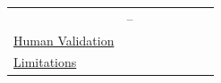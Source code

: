 \documentclass[smallextended]{svjour3}
\newcommand{\must}{\textbf{must}\xspace}
\newcommand{\should}{\textbf{should}\xspace}
\newcommand{\iconM}{\usebox{\iconMbox}\xspace}
\newcommand{\iconS}{\usebox{\iconSbox}\xspace}
\newcommand{\iconM}{●\xspace}
\newcommand{\iconS}{○\xspace}
\newcommand{\newtools}{\hyperref[sec:llms-for-new-software-engineering-tools]{\emph{LLMs for Tools}}\xspace}
\newcommand{\newtools}{\href{/study-types\#llms-for-new-software-engineering-tools}{\emph{LLMs for Tools}}\xspace}
\begin{document}
\begin{appendices}
\begin{center}
\begin{tabular}{@{} l c c c c c c c @{}}
  & --     %
  & \iconS %
  & \iconM %
  \\
\hyperref[sec:use-human-validation-for-llm-outputs]{Human Validation}
  & \iconS %
  & \iconS %
  & \iconS %
  & \iconS %
  & \iconS %
  & \iconS %
  & \iconS %
  \\
\hyperref[sec:report-limitations-and-mitigations]{Limitations}
  & \iconM %
  & \iconM %
  & \iconM %
  & \iconM %
  & \iconM %
  & \iconM %
  & \iconM %
  \\
\bottomrule
\end{tabular}
\end{center}
 

\end{appendices}
\end{document}
